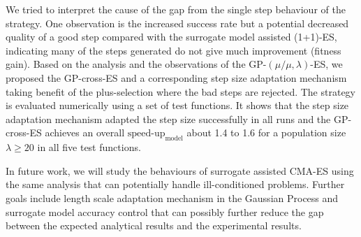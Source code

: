 We tried to interpret the cause of the gap from the single step behaviour of the strategy. One observation is the increased success rate but a potential decreased quality of a good step compared with the surrogate model assisted (1+1)-ES, indicating many of the steps generated do not give much improvement (fitness gain). Based on the analysis and the observations of the GP-$(\mu/\mu,\lambda)$-ES, we proposed the GP-cross-ES and a corresponding step size adaptation mechanism taking benefit of the plus-selection where the bad steps are rejected. The strategy is evaluated numerically using a set of test functions. It shows that the step size adaptation mechanism adapted the step size successfully in all runs and the GP-cross-ES achieves an overall $\text{speed-up}_{\text{model}}$ about 1.4 to 1.6 for a population size $\lambda \geq 20$ in all five test functions. 















In future work, we will study the behaviours of surrogate assisted CMA-ES using the same analysis that can potentially handle ill-conditioned problems. Further goals include length scale adaptation mechanism in the Gaussian Process and surrogate model accuracy control that can possibly further reduce the gap between the expected analytical results and the experimental results. 

